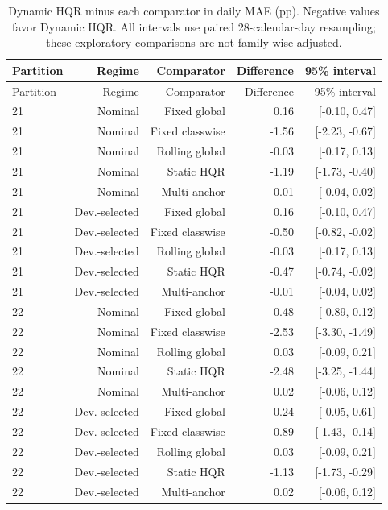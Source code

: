 \begingroup\small\setlength{\tabcolsep}{3pt}
\begin{longtable}{lrrrr}
\caption{Dynamic HQR minus each comparator in daily MAE (pp). Negative values favor Dynamic HQR. All intervals use paired 28-calendar-day resampling; these exploratory comparisons are not family-wise adjusted.}\label{tab:final-risk-paired}\\
\toprule
Partition & Regime & Comparator & Difference & 95\% interval\\
\midrule
\endfirsthead
\toprule
Partition & Regime & Comparator & Difference & 95\% interval\\
\midrule
\endhead
21 & Nominal & Fixed global & 0.16 & [-0.10, 0.47]\\
21 & Nominal & Fixed classwise & -1.56 & [-2.23, -0.67]\\
21 & Nominal & Rolling global & -0.03 & [-0.17, 0.13]\\
21 & Nominal & Static HQR & -1.19 & [-1.73, -0.40]\\
21 & Nominal & Multi-anchor & -0.01 & [-0.04, 0.02]\\
21 & Dev.-selected & Fixed global & 0.16 & [-0.10, 0.47]\\
21 & Dev.-selected & Fixed classwise & -0.50 & [-0.82, -0.02]\\
21 & Dev.-selected & Rolling global & -0.03 & [-0.17, 0.13]\\
21 & Dev.-selected & Static HQR & -0.47 & [-0.74, -0.02]\\
21 & Dev.-selected & Multi-anchor & -0.01 & [-0.04, 0.02]\\
22 & Nominal & Fixed global & -0.48 & [-0.89, 0.12]\\
22 & Nominal & Fixed classwise & -2.53 & [-3.30, -1.49]\\
22 & Nominal & Rolling global & 0.03 & [-0.09, 0.21]\\
22 & Nominal & Static HQR & -2.48 & [-3.25, -1.44]\\
22 & Nominal & Multi-anchor & 0.02 & [-0.06, 0.12]\\
22 & Dev.-selected & Fixed global & 0.24 & [-0.05, 0.61]\\
22 & Dev.-selected & Fixed classwise & -0.89 & [-1.43, -0.14]\\
22 & Dev.-selected & Rolling global & 0.03 & [-0.09, 0.21]\\
22 & Dev.-selected & Static HQR & -1.13 & [-1.73, -0.29]\\
22 & Dev.-selected & Multi-anchor & 0.02 & [-0.06, 0.12]\\
\bottomrule
\end{longtable}
\endgroup
